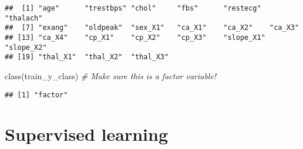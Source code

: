 \documentclass[
]{book}
\newenvironment{Shaded}{\begin{snugshade}}{\end{snugshade}}
\newcommand{\CommentTok}[1]{\textcolor[rgb]{0.56,0.35,0.01}{\textit{#1}}}
\newcommand{\FunctionTok}[1]{\textcolor[rgb]{0.00,0.00,0.00}{#1}}
\newcommand{\NormalTok}[1]{#1}
\newcommand{\OtherTok}[1]{\textcolor[rgb]{0.56,0.35,0.01}{#1}}
\newcommand{\SpecialCharTok}[1]{\textcolor[rgb]{0.00,0.00,0.00}{#1}}
\begin{document}
\begin{Shaded}
\end{Shaded}

\begin{verbatim}
##  [1] "age"      "trestbps" "chol"     "fbs"      "restecg"  "thalach" 
##  [7] "exang"    "oldpeak"  "sex_X1"   "ca_X1"    "ca_X2"    "ca_X3"   
## [13] "ca_X4"    "cp_X1"    "cp_X2"    "cp_X3"    "slope_X1" "slope_X2"
## [19] "thal_X1"  "thal_X2"  "thal_X3"
\end{verbatim}

\begin{Shaded}
\begin{Highlighting}[]
\FunctionTok{class}\NormalTok{(train\_y\_class) }\CommentTok{\# Make sure this is a factor variable!}
\end{Highlighting}
\end{Shaded}

\begin{verbatim}
## [1] "factor"
\end{verbatim}

\hypertarget{supervised-learning}{%
\section{Supervised learning}\label{supervised-learning}}
\end{document}
